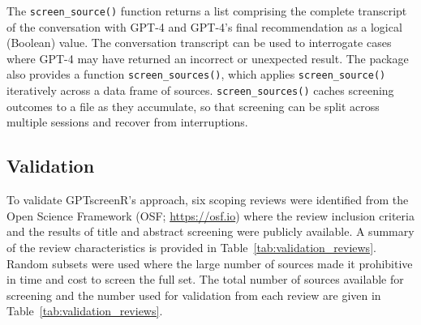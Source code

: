 \documentclass[10pt,a4paper,twocolumn]{article}
\begin{document}
The \texttt{screen\_source()} function returns a list comprising the complete transcript of the conversation with GPT-4 and GPT-4's final recommendation as a logical (Boolean) value. The conversation transcript can be used to interrogate cases where GPT-4 may have returned an incorrect or unexpected result. The package also provides a function \texttt{screen\_sources()}, which applies \texttt{screen\_source()} iteratively across a data frame of sources. \texttt{screen\_sources()} caches screening outcomes to a file as they accumulate, so that screening can be split across multiple sessions and recover from interruptions.

\subsection{Validation}

To validate GPTscreenR's approach, six scoping reviews were identified from the Open Science Framework (OSF; \url{https://osf.io}) where the review inclusion criteria and the results of title and abstract screening were publicly available. A summary of the review characteristics is provided in Table~\ref{tab:validation_reviews}. Random subsets were used where the large number of sources made it prohibitive in time and cost to screen the full set. The total number of sources available for screening and the number used for validation from each review are given in Table~\ref{tab:validation_reviews}.
\end{document}
